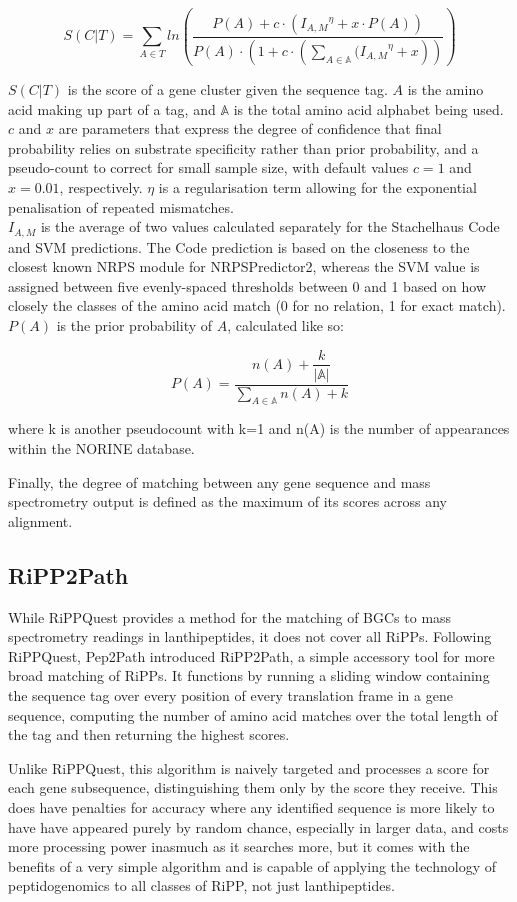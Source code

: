 \documentclass{l4proj}
\newcommand{\cit}[1]{\citep{#1}}
\newcommand{\pa}{
	\begin{equation} \label{eq:pa}
		P(A) = \dfrac{n(A) + \dfrac{k}{|\mathbb{A}|}}{\sum_{A \in \mathbb{A}}{n(A) + k}}
	\end{equation}
}
\newcommand{\scoreeqn}{
	\begin{equation} \label{eq:scoreeqn}
		S(C|T) = \sum_{A \in T}{ln\left(\dfrac{P(A) + c\cdot ({I_{A, M}}^\eta + x\cdot {P(A)})}
								 	{P(A)\cdot(1 + c \cdot (\sum_{A \in \mathbb{A}}{({I_{A, M}}^\eta} + x))}\right)}
	\end{equation}
}
\begin{document}
\scoreeqn

\(S(C|T)\) is the score of a gene cluster given the sequence tag. \(A\) is the amino acid making up part of a tag, and \(\mathbb{A}\) is the total amino acid alphabet being used. \(c\) and \(x\) are parameters that express the degree of confidence that final probability relies on substrate specificity rather than prior probability, and a pseudo-count to correct for small sample size, with default values \(c=1\) and \(x=0.01\), respectively. \(\eta\) is a regularisation term allowing for the exponential penalisation of repeated mismatches. \\

\(I_{A, M}\) is the average of two values calculated separately for the Stachelhaus Code and SVM predictions. The Code prediction is based on the closeness to the closest known NRPS module for NRPSPredictor2, whereas the SVM value is assigned between five evenly-spaced thresholds between 0 and 1 based on how closely the classes of the amino acid match (0 for no relation, 1 for exact match). \\

\(P(A)\) is the prior probability of \(A\), calculated like so:

\pa

where k is another pseudocount with k=1 and n(A) is the number of appearances within the NORINE database. \cit{norine}

Finally, the degree of matching between any gene sequence and mass spectrometry output is defined as the maximum of its scores across any alignment.

\subsection{RiPP2Path}

While RiPPQuest provides a method for the matching of BGCs to mass spectrometry readings in lanthipeptides, it does not cover all RiPPs. Following RiPPQuest, Pep2Path introduced RiPP2Path, a simple accessory tool for more broad matching of RiPPs. It functions by running a sliding window containing the sequence tag over every position of every translation frame in a gene sequence, computing the number of amino acid matches over the total length of the tag and then returning the highest scores.

Unlike RiPPQuest, this algorithm is naively targeted and processes a score for each gene subsequence, distinguishing them only by the score they receive. This does have penalties for accuracy where any identified sequence is more likely to have have appeared purely by random chance, especially in larger data, and costs more processing power inasmuch as it searches more, but it comes with the benefits of a very simple algorithm and is capable of applying the technology of peptidogenomics to all classes of RiPP, not just lanthipeptides.
\end{document}
